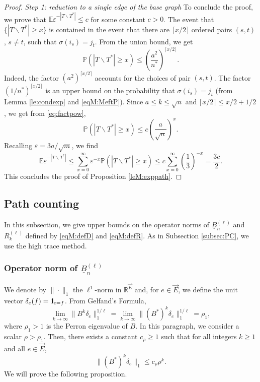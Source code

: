 \documentclass[11pt]{article}
\newcommand{\dE}{\mathbb {E}}
\newcommand{\dP}{\mathbb{P}}
\newcommand{\dR}{\mathbb {R}}
\newcommand{\PAR}[1]{{{\left(#1\right)}}} %
\newcommand{\uB}{{\underline B}}
\newcommand{\1}{1\!\!{\sf I}}\newcommand{\IND}{\1}
\newcommand{\veps}{\varepsilon}
\begin{document}
\begin{proof}  {\em Step 1: reduction to a single edge of the base graph}
To conclude the proof, we prove that  $\dE \veps^{-|T \backslash T^*|} \leq c$ for some constant $c>0$. The event that $\{|T \backslash T^*| \geq x \}$ is contained in the event that there are $\lceil x / 2 \rceil$ ordered pairs $(s,t)$, $s\ne t$, such  that $\sigma(i_s) = j_t $.  From the union bound, we get
$$
\dP \PAR{|T \backslash T^*| \geq x } \leq \PAR{ \frac{ a^2}{n^*} }^{\lceil x / 2 \rceil}.
$$
Indeed, the factor $( a^2 )^{\lceil x / 2 \rceil}$ accounts for the choices of pair $(s,t)$. The factor $(1/n^*)^{  \lceil x / 2 \rceil}$ is an upper bound on the probability that  $\sigma(i_s) = j_t$ (from  Lemma \ref{le:condexp} and \eqref{eqM:MeftP}). Since $a \leq k \leq \sqrt{n}$ and $\lceil x / 2 \rceil \leq x/2 +1/2$, we get from \eqref{eq:factpow},
$$
\dP \PAR{|T \backslash T^*| \geq x } \leq c \PAR{ \frac{ a}{\sqrt{n} } }^{x}.
$$
Recalling $\veps = 3a / \sqrt m$, we find 
$$
 \dE  \veps^{-|T \backslash T^*|} \leq \sum_{x=0}^\infty \veps^{-x} \dP ( |T \backslash T^*| \geq x) \leq c \sum_{x = 0}^{\infty}   \PAR{\frac 1 3}^{-x} = \frac{3c}{2}.
$$
 This concludes the proof of Proposition \ref{leM:exppath}. \end{proof}



\subsection{Path counting}

\label{subsecM:PC}
In this subsection, we give upper bounds on the operator norms of $\uB_n^{(\ell)}$ and $R^{(\ell)}_{k}$ defined by \eqref{eqM:defD} and \eqref{eqM:defR}. As in Subsection \ref{subsec:PC}, we use the high trace method. 


\subsubsection{Operator norm of $\uB_{n}^{(\ell)}$}



We denote by $\| \cdot \|_1$ the $\ell^1$-norm in $\dR^{\vec E}$ and, for $e \in \vec E$, we define the unit vector $\delta_e ( f) = \IND_{e = f}$. From Gelfand's Formula,
$$
\lim_{k \to \infty} \| B^k  \delta_e \|^{1/\ell}_1 = \lim_{k \to \infty} \| (B^*)^k  \delta_e \|^{1/\ell}_1 = \rho_1, 
$$
where $\rho_1 >1$ is the Perron eigenvalue of $B$. In this paragraph, we consider a scalar $\rho >  \rho_1$. Then, there exists a constant $c_\rho \geq 1$ such that for all integers $k \geq 1$ and all $e \in \vec E$, 
\begin{equation}\label{eq:defrho}
\| (B^*)^k  \delta_e \|_1 \leq c_\rho \rho^{k}. 
\end{equation}
We will prove the following proposition. 
\end{document}
